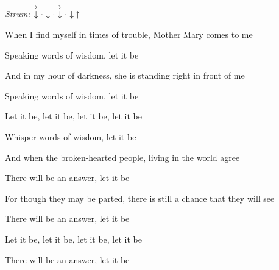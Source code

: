 \begin{song}


\begin{headerbox}
\textit{Strum:} $\AccentDown\Miss\Down\Miss\AccentDown\Miss\Down\Up$
\end{headerbox}

\begin{hchordbox}
\end{hchordbox}

\bigskip

When I find myself in times of trouble, Mother Mary comes to me \par
{}Speaking words of wisdom, let it be    \par
And in my hour of darkness, she is standing right in front of me \par
{}Speaking words of wisdom, let it be    \par

\bigskip

Let it be, let it be, let it be, let it be \par
{}Whisper words of wisdom, let it be    \par

\bigskip

And when the broken-hearted people, living in the world agree \par
{}There will be an answer, let it be    \par
For though they may be parted, there is still a chance that they will see \par
{}There will be an answer, let it be    \par

\bigskip

Let it be, let it be, let it be, let it be \par
{}There will be an answer, let it be    \par


\end{song}
